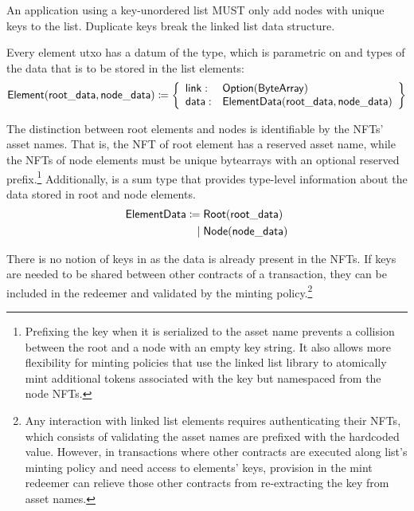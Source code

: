 \documentclass[../midgard.tex]{subfiles}
\begin{document}
\newcommand{\unorderedListWarning}[0]{
\begin{warningblock}
An application using a key-unordered list MUST only add nodes with unique keys to the list.
Duplicate keys break the linked list data structure.
\end{warningblock}
}
\unorderedListWarning

Every element utxo has a datum of the  type, which is parametric on  and  types of the data that is to be stored in the list elements:
\begin{equation*}
    \mathsf{Element} (\mathsf{root\_data}, \mathsf{node\_data}) \coloneq \left\{
    \begin{array}{ll}
        \mathsf{link} : & \mathsf{Option}(\mathsf{ByteArray}) \\
        \mathsf{data} : & \mathsf{ElementData} (\mathsf{root\_data}, \mathsf{node\_data})
    \end{array} \right\}
\end{equation*}

The distinction between root elements and nodes is identifiable by the NFTs' asset names.
That is, the NFT of root element has a reserved asset name, while the NFTs of node elements must be unique bytearrays with an optional reserved prefix.\footnote{Prefixing the key when it is serialized to the asset name prevents a collision between the root and a node with an empty key string.
It also allows more flexibility for minting policies that use the linked list library to atomically mint additional tokens associated with the key but namespaced from the node NFTs.}
Additionally,  is a sum type that provides type-level information about the data stored in root and node elements.
\begin{align*}
  \mathsf{ElementData} \coloneq\;& \mathsf{Root} (\mathsf{root\_data}) \\
                      \mid\;& \mathsf{Node} (\mathsf{node\_data})
\end{align*}

There is no notion of keys in  as the data is already present in the NFTs.
If keys are needed to be shared between other contracts of a transaction, they can be included in the redeemer and validated by the minting policy.\footnote{Any interaction with linked list elements requires authenticating their NFTs, which consists of validating the asset names are prefixed with the hardcoded value.
However, in transactions where other contracts are executed along list's minting policy and need access to elements' keys, provision in the mint redeemer can relieve those other contracts from re-extracting the key from asset names.}
\end{document}
